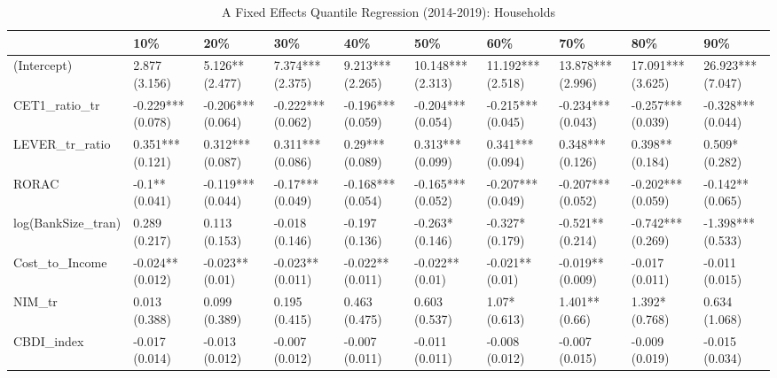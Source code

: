 \begin{table}[ht]
\centering
\caption{A Fixed Effects Quantile Regression (2014-2019): Households} 
\begingroup\small
\begin{tabular}{llllllllll}
  \toprule
 & 10\% & 20\% & 30\% & 40\% & 50\% & 60\% & 70\% & 80\% & 90\% \\ 
  \midrule
(Intercept) & 2.877 (3.156) & 5.126** (2.477) & 7.374*** (2.375) & 9.213*** (2.265) & 10.148*** (2.313) & 11.192*** (2.518) & 13.878*** (2.996) & 17.091*** (3.625) & 26.923*** (7.047) \\ 
  CET1\_ratio\_tr & -0.229*** (0.078) & -0.206*** (0.064) & -0.222*** (0.062) & -0.196*** (0.059) & -0.204*** (0.054) & -0.215*** (0.045) & -0.234*** (0.043) & -0.257*** (0.039) & -0.328*** (0.044) \\ 
  LEVER\_tr\_ratio & 0.351*** (0.121) & 0.312*** (0.087) & 0.311*** (0.086) & 0.29*** (0.089) & 0.313*** (0.099) & 0.341*** (0.094) & 0.348*** (0.126) & 0.398** (0.184) & 0.509* (0.282) \\ 
  RORAC & -0.1** (0.041) & -0.119*** (0.044) & -0.17*** (0.049) & -0.168*** (0.054) & -0.165*** (0.052) & -0.207*** (0.049) & -0.207*** (0.052) & -0.202*** (0.059) & -0.142** (0.065) \\ 
  log(BankSize\_tran) & 0.289 (0.217) & 0.113 (0.153) & -0.018 (0.146) & -0.197 (0.136) & -0.263* (0.146) & -0.327* (0.179) & -0.521** (0.214) & -0.742*** (0.269) & -1.398*** (0.533) \\ 
  Cost\_to\_Income & -0.024** (0.012) & -0.023** (0.01) & -0.023** (0.011) & -0.022** (0.011) & -0.022** (0.01) & -0.021** (0.01) & -0.019** (0.009) & -0.017 (0.011) & -0.011 (0.015) \\ 
  NIM\_tr & 0.013 (0.388) & 0.099 (0.389) & 0.195 (0.415) & 0.463 (0.475) & 0.603 (0.537) & 1.07* (0.613) & 1.401** (0.66) & 1.392* (0.768) & 0.634 (1.068) \\ 
  CBDI\_index & -0.017 (0.014) & -0.013 (0.012) & -0.007 (0.012) & -0.007 (0.011) & -0.011 (0.011) & -0.008 (0.012) & -0.007 (0.015) & -0.009 (0.019) & -0.015 (0.034) \\ 
   \bottomrule
\end{tabular}
\endgroup
\end{table}
